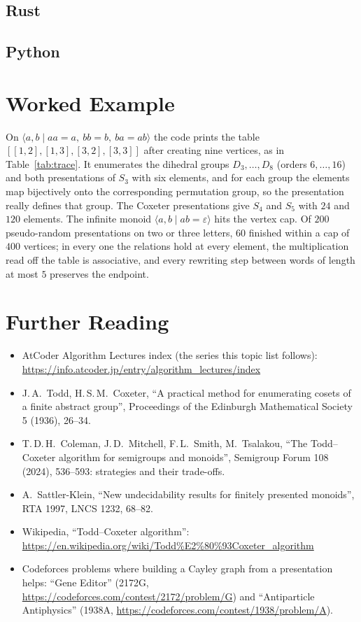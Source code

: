 \documentclass[11pt]{article}
\begin{document}
\codenote
\subsection{Rust}

\subsection{Python}

\section{Worked Example}
\begin{examplebox}
On $\langle a,b\mid aa=a,\ bb=b,\ ba=ab\rangle$ the code prints the table $[[1,2],[1,3],[3,2],[3,3]]$ after creating nine vertices, as in Table~\ref{tab:trace}.
It enumerates the dihedral groups $D_3,\dots,D_8$ (orders $6,\dots,16$) and both presentations of $S_3$ with six elements, and for each group the elements map bijectively onto the corresponding permutation group, so the presentation really defines that group.
The Coxeter presentations give $S_4$ and $S_5$ with $24$ and $120$ elements. The infinite monoid $\langle a,b\mid ab=\varepsilon\rangle$ hits the vertex cap.
Of $200$ pseudo-random presentations on two or three letters, $60$ finished within a cap of $400$ vertices; in every one the relations hold at every element, the multiplication read off the table is associative, and every rewriting step between words of length at most $5$ preserves the endpoint.
\end{examplebox}

\section{Further Reading}
\begin{itemize}[leftmargin=1.5em]
  \item AtCoder Algorithm Lectures index (the series this topic list follows):
        \url{https://info.atcoder.jp/entry/algorithm_lectures/index}
  \item J.\,A.\ Todd, H.\,S.\,M.\ Coxeter, ``A practical method for enumerating cosets of a finite abstract group'', Proceedings of the Edinburgh Mathematical Society 5 (1936), 26--34.
  \item T.\,D.\,H.\ Coleman, J.\,D.\ Mitchell, F.\,L.\ Smith, M.\ Tsalakou, ``The Todd--Coxeter algorithm for semigroups and monoids'', Semigroup Forum 108 (2024), 536--593: strategies and their trade-offs.
  \item A.\ Sattler-Klein, ``New undecidability results for finitely presented monoids'', RTA 1997, LNCS 1232, 68--82.
  \item Wikipedia, ``Todd--Coxeter algorithm'': \url{https://en.wikipedia.org/wiki/Todd\%E2\%80\%93Coxeter_algorithm}
  \item Codeforces problems where building a Cayley graph from a presentation helps: ``Gene Editor'' (2172G, \url{https://codeforces.com/contest/2172/problem/G}) and ``Antiparticle Antiphysics'' (1938A, \url{https://codeforces.com/contest/1938/problem/A}).
\end{itemize}
\end{document}
